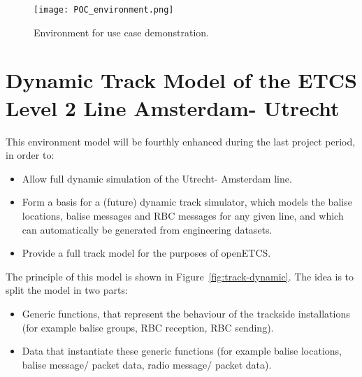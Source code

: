 	
\begin{figure}
  \centering
  \texttt{[image: POC\_environment.png]}
  \caption{Environment for use case demonstration.}
  \label{fig:WP3-demo}
\end{figure}


\section{Dynamic Track Model of the ETCS Level 2 Line Amsterdam- Utrecht}

This environment model will be fourthly enhanced during the last project period, in order to:
\begin{itemize}
\item Allow full dynamic simulation of the Utrecht- Amsterdam line.
\item Form a basis for a (future) dynamic track simulator, which models the balise locations, balise messages and RBC messages for any given line, and which can automatically be generated from engineering datasets.
\item Provide a full track model for the purposes of openETCS.
\end{itemize}

The principle of this model is shown in Figure~\ref{fig:track-dynamic}. 
The idea is to split the model in two parts:
\begin{itemize}
\item Generic functions, that represent the behaviour of the trackside installations (for example balise groups, RBC reception, RBC sending).
\item Data that instantiate these generic functions (for example balise locations, balise message/ packet data, radio message/ packet data).
\end{itemize}

